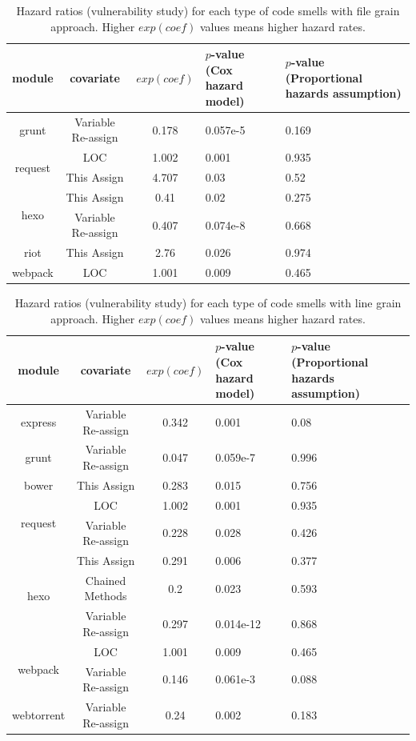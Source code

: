 {\begin{table}[t]
	\centering
	\scriptsize
	\caption{Hazard ratios (vulnerability study) for each type of code smells with file grain approach. Higher $exp(coef)$ values means higher hazard rates.}
	\begin{tabular}{c|c|c|p{1.1cm}|p{1.3cm}}
		\hline
		module & covariate & $exp(coef)$ & $p$-value (Cox hazard model) & $p$-value (Proportional hazards assumption) \\ \hline
		\multirow{1}{*}{grunt} 
		& Variable Re-assign & 0.178 & 0.057e-5 & 0.169 \\ \hline
		\multirow{2}{*}{request}
		& LOC & 1.002 & 0.001 & 0.935 \\ \cline{2-5}
		& This Assign & 4.707 & 0.03 & 0.52 \\ \hline
		\multirow{2}{*}{hexo}
		& This Assign & 0.41 & 0.02 & 0.275 \\ \cline{2-5}
		& Variable Re-assign & 0.407 & 0.074e-8 & 0.668 \\ \hline
		\multirow{1}{*}{riot}
		& This Assign & 2.76 & 0.026 & 0.974 \\ \hline
		\multirow{1}{*}{webpack}
		& LOC & 1.001 & 0.009 & 0.465 \\ \hline
	\end{tabular}
	\label{smelltypes4}

\end{table}

\begin{table}[t]
	\centering
	\scriptsize
	\caption{Hazard ratios (vulnerability study) for each type of code smells with line grain approach. Higher $exp(coef)$ values means higher hazard rates.}
	\begin{tabular}{c|c|c|p{1.1cm}|p{1.3cm}}
		\hline
		module & covariate & $exp(coef)$ & $p$-value (Cox hazard model) & $p$-value (Proportional hazards assumption) \\ \hline
		\multirow{1}{*}{express}
		& Variable Re-assign & 0.342 & 0.001 & 0.08  \\ \hline
		\multirow{1}{*}{grunt} 
		& Variable Re-assign & 0.047 & 0.059e-7 & 0.996 \\ \hline
		\multirow{1}{*}{bower}
		& This Assign & 0.283 & 0.015 & 0.756 \\ \hline
		\multirow{2}{*}{request}
		& LOC & 1.002 & 0.001 & 0.935 \\ \cline{2-5}
		& Variable Re-assign & 0.228 & 0.028 & 0.426 \\ \hline
		\multirow{3}{*}{hexo}
		& This Assign & 0.291 & 0.006 & 0.377 \\ \cline{2-5}
		& Chained Methods & 0.2 & 0.023 & 0.593 \\ \cline{2-5}
		& Variable Re-assign & 0.297 & 0.014e-12 & 0.868 \\ \hline
		\multirow{2}{*}{webpack}
		& LOC & 1.001 & 0.009 & 0.465 \\ \cline{2-5}
		& Variable Re-assign & 0.146 & 0.061e-3 & 0.088 \\ \hline
		\multirow{1}{*}{webtorrent}
		& Variable Re-assign & 0.24 & 0.002 & 0.183 \\ \hline
	\end{tabular}
	\label{smelltypes5}


\end{table}}
